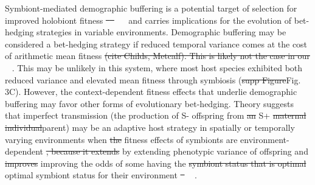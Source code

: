 \documentclass[lineno, sn-basic]{sn-jnl}%
\providecommand{\DIFadd}[1]{{\protect\color{blue}#1}} %
\providecommand{\DIFdel}[1]{{\protect\color{red}\protect\scriptsize\sout{#1}}}
\providecommand{\DIFadd}[1]{{\protect\color{blue}\uwave{#1}}} %
\providecommand{\DIFdel}[1]{{\protect\color{red}\sout{#1}}}                      %
\providecommand{\DIFaddbegin}{} %
\providecommand{\DIFaddend}{} %
\providecommand{\DIFdelbegin}{} %
\providecommand{\DIFdelend}{} %
\newcommand{\DIFscaledelfig}{0.5}
\newlength{\DIFdelgraphicswidth} %
\newlength{\DIFdelgraphicsheight} %
\newcommand{\DIFaddincludegraphics}[2][]{{\color{blue}\fbox{\DIFOincludegraphics[#1]{#2}}}} %
\newcommand{\DIFdelincludegraphics}[2][]{%
\sbox{\DIFdelgraphicsbox}{\DIFOincludegraphics[#1]{#2}}%
\settoboxwidth{\DIFdelgraphicswidth}{\DIFdelgraphicsbox} %
\settoboxtotalheight{\DIFdelgraphicsheight}{\DIFdelgraphicsbox} %
\scalebox{\DIFscaledelfig}{%
\parbox[b]{\DIFdelgraphicswidth}{\usebox{\DIFdelgraphicsbox}\\[-\baselineskip] \rule{\DIFdelgraphicswidth}{0em}}\llap{\resizebox{\DIFdelgraphicswidth}{\DIFdelgraphicsheight}{%
\setlength{\unitlength}{\DIFdelgraphicswidth}%
\begin{picture}(1,1)%
\thicklines\linethickness{2pt} %
{\color[rgb]{1,0,0}\put(0,0){\framebox(1,1){}}}%
{\color[rgb]{1,0,0}\put(0,0){\line( 1,1){1}}}%
{\color[rgb]{1,0,0}\put(0,1){\line(1,-1){1}}}%
\end{picture}%
}\hspace*{3pt}}} %
} %
\DeclareRobustCommand{\DIFaddbegin}{\DIFOaddbegin \let\includegraphics\DIFaddincludegraphics} %
\DeclareRobustCommand{\DIFaddend}{\DIFOaddend \let\includegraphics\DIFOincludegraphics} %
\DeclareRobustCommand{\DIFdelbegin}{\DIFOdelbegin \let\includegraphics\DIFdelincludegraphics} %
\DeclareRobustCommand{\DIFdelend}{\DIFOaddend \let\includegraphics\DIFOincludegraphics} %
\begin{document}
Symbiont-mediated demographic buffering is a potential target of selection for improved holobiont fitness \DIFdelbegin \DIFdel{\mbox{%
\cite{vandenkoornhuyse2015importance} }\hspace{0pt}%
}\DIFdelend \DIFaddbegin \DIFadd{\mbox{%
\citep{vandenkoornhuyse2015importance} }\hspace{0pt}%
}\DIFaddend and carries implications for the evolution of bet-hedging strategies in variable environments. 
Demographic buffering may be considered a bet-hedging strategy if reduced temporal variance comes at the cost of arithmetic mean fitness \DIFdelbegin \DIFdel{(cite Childs, Metcalf). 
This is likely not the case in our }\DIFdelend \DIFaddbegin \DIFadd{\mbox{%
\citep{childs2010evolutionary}}\hspace{0pt}%
. 
This may be unlikely in this }\DIFaddend system, where most host species exhibited both reduced variance and elevated mean fitness through symbiosis (\DIFdelbegin \DIFdel{supp Figure}\DIFdelend \DIFaddbegin \DIFadd{Fig. 3C}\DIFaddend ). 
However, the context-dependent fitness effects that underlie demographic buffering may favor other forms of evolutionary bet-hedging. 
Theory suggests that imperfect transmission (the production of S- offspring from \DIFdelbegin \DIFdel{an }\DIFdelend S+ \DIFdelbegin \DIFdel{maternal individual}\DIFdelend \DIFaddbegin \DIFadd{parent}\DIFaddend ) may be an adaptive host strategy in spatially or temporally varying environments when \DIFdelbegin \DIFdel{the }\DIFdelend fitness effects of symbionts are environment-dependent \DIFdelbegin \DIFdel{, because it extends }\DIFdelend \DIFaddbegin \DIFadd{by extending }\DIFaddend phenotypic variance of offspring and \DIFdelbegin \DIFdel{improves }\DIFdelend \DIFaddbegin \DIFadd{improving }\DIFaddend the odds of some having the \DIFdelbegin \DIFdel{symbiont status that is optimal }\DIFdelend \DIFaddbegin \DIFadd{optimal symbiont status }\DIFaddend for their environment \DIFdelbegin \DIFdel{\mbox{%
\cite{brown2019evolution,bruijning2022natural,lange2023impact}}\hspace{0pt}%
}\DIFdelend \DIFaddbegin \DIFadd{\mbox{%
\citep{brown2019evolution,bruijning2022natural,lange2023impact}}\hspace{0pt}%
}\DIFaddend . 
\end{document}
